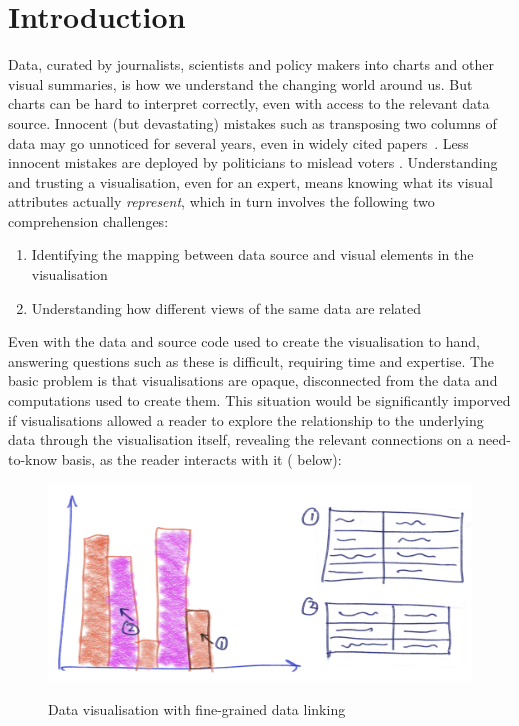 \section{Introduction}

Data, curated by journalists, scientists and policy makers into charts and other visual summaries, is how we understand the changing world around us. But charts can be hard to interpret correctly, even with access to the relevant data source. Innocent (but devastating) mistakes such as transposing two columns of data may go unnoticed for several years, even in widely cited papers~\cite{miller06}. Less innocent mistakes are deployed by politicians to mislead voters \cite{fullfact19}. Understanding and trusting a visualisation, even for an expert, means knowing what its visual attributes actually \emph{represent}, which in turn involves the following two comprehension challenges:

\begin{enumerate}
  \item Identifying the mapping between data source and visual elements in the visualisation
  \item Understanding how different views of the same data are related
\end{enumerate}

\noindent Even with the data and source code used to create the visualisation to hand, answering questions such as these is difficult, requiring time and expertise. The basic problem is that visualisations are opaque, disconnected from the data and computations used to create them. This situation would be significantly imporved if visualisations allowed a reader to explore the relationship to the underlying data through the visualisation itself, revealing the relevant connections on a need-to-know basis, as the reader interacts with it ( below):

\begin{figure}[H]
   {\includegraphics[scale=0.07]{fig/example/data-linking.png}}
   \caption{Data visualisation with fine-grained data linking}
   \label{fig:introduction:data-linking}
\end{figure}

